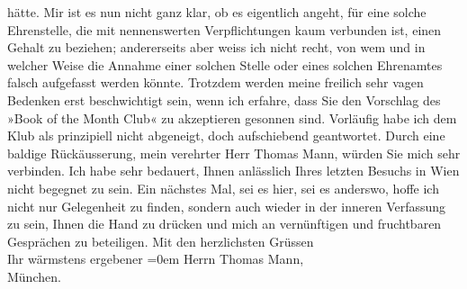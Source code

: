 \begin{ledgroupsized}[t]{13cm}
               hätte. Mir ist es nun nicht ganz klar, ob es eigentlich angeht, für eine solche
               Ehrenstelle, die mit nennenswerten Verpflichtungen kaum verbunden ist, einen Gehalt
               zu beziehen; andererseits aber weiss ich nicht recht, von wem und in welcher Weise
               die Annahme einer solchen Stelle oder eines solchen Ehrenamtes falsch aufgefasst
               werden könnte. Trotzdem werden meine freilich sehr vagen Bedenken erst beschwichtigt
               sein, wenn ich erfahre, dass Sie den Vorschlag des »Book
                  of the Month Club« zu akzeptieren gesonnen sind. Vorläufig habe ich dem Klub
               als prinzipiell nicht abgeneigt, doch aufschiebend geantwortet. Durch eine baldige
               Rückäusserung, mein verehrter Herr Thomas Mann, würden Sie mich sehr verbinden.\pend
           \pstart
           Ich habe sehr bedauert\introOben{},\introOben{} Ihnen anlässlich Ihres letzten
               Besuchs in Wien nicht begegnet zu sein. Ein nächstes
               Mal, sei es hier, sei es anderswo, hoffe ich nicht nur Gelegenheit zu finden, sondern auch  wieder in der inneren Verfassung zu sein\introOben{},\introOben{}
               Ihnen die Hand zu drücken und mich an vernünftigen und fruchtbaren Gesprächen zu
               beteiligen.\pend
           \pstart
           Mit den herzlichsten Grüssen{\\[\baselineskip]}Ihr wärmstens ergebener\pend
           \leftskip=0em{}{\bigskip}\pstart
           \noindent{}Herrn Thomas Mann,{\\}München.\pend
           
         
         \endnumbering{}\end{ledgroupsized}  \newcommand{\dateiname}{L02507}\newcommand{\titel}{Arthur Schnitzler an Thomas Mann, 30. 1. 1929}\newcommand{\editorInnen}{Martin Anton Müller und Gerd-Hermann Susen}
      